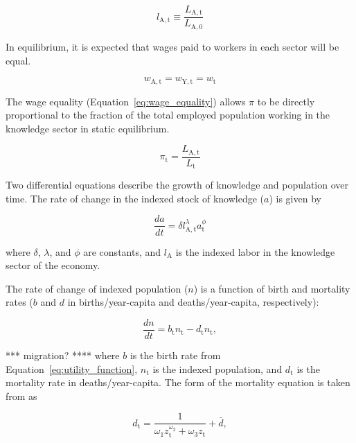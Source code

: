 \documentclass[letterpaper,12pt]{article}
\begin{document}
\begin{equation}
	l_\mathrm{A,t} \equiv \frac{L_\mathrm{A,t}}{L_\mathrm{A,0}}
\end{equation}

In equilibrium, it is expected that wages paid to workers in each sector will be equal.

\begin{equation} \label{eq:wage_equality}
	w_\mathrm{A,t} = w_\mathrm{Y,t} = w_\mathrm{t}
\end{equation}

The wage equality (Equation~\ref{eq:wage_equality}) allows $\pi$ to be directly proportional to the fraction of the total employed population working in the knowledge sector in static equilibrium.

\begin{equation} \label{eq:pi}
	\pi_\mathrm{t} = \frac{L_\mathrm{A,t}}{L_\mathrm{t}}
\end{equation}

Two differential equations describe the growth of knowledge and population over time. The rate of change in the indexed stock of knowledge ($a$) is given by

\begin{equation} \label{eq:da_dt}
	\frac{da}{dt} = \delta l_\mathrm{A,t}^\lambda a_\mathrm{t}^\phi
\end{equation}

\noindent where $\delta$, $\lambda$, and $\phi$ are constants, and $l_\mathrm{A}$ is the indexed labor in the knowledge sector of the economy.

The rate of change of indexed population ($n$) is a function of birth and mortality rates ($b$ and $d$ in births/year-capita and deaths/year-capita, respectively):

\begin{equation} \label{eq:dn_dt}
	\frac{dn}{dt} = b_\mathrm{t} n_\mathrm{t} - d_\mathrm{t} n_\mathrm{t},
\end{equation}

\noindent **** migration? **** where $b$ is the birth rate from Equation~\ref{eq:utility_function}, $n_\mathrm{t}$ is the indexed population, and $d_\mathrm{t}$ is the mortality rate in deaths/year-capita. The form of the mortality equation is taken from \citet{Jones:2001wn} as

\begin{equation} \label{eq:mortality_rate}
	d_\mathrm{t} = \frac{1}{\omega_\mathrm{1} z_\mathrm{t}^{\omega_\mathrm{2}} + \omega_\mathrm{3} z_\mathrm{t}} + \bar d,
\end{equation}
\end{document}
